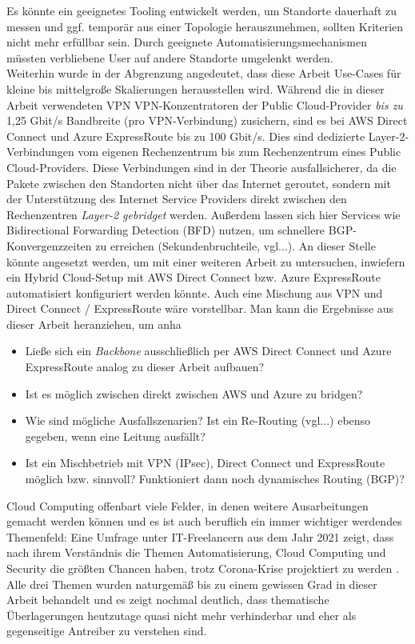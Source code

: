 Es könnte ein geeignetes Tooling entwickelt werden, um Standorte dauerhaft zu messen und ggf. temporär aus einer Topologie herauszunehmen, sollten Kriterien nicht mehr erfüllbar sein. Durch geeignete Automatisierungsmechanismen müssten verbliebene User auf andere Standorte \glqq umgelenkt\grqq{} werden.\\
Weiterhin wurde in der Abgrenzung angedeutet, dass diese Arbeit Use-Cases für kleine bis mittelgroße Skalierungen herausstellen wird. Während die in dieser Arbeit verwendeten VPN VPN-Konzentratoren der Public Cloud-Provider \textit{bis zu} 1,25 Gbit/s Bandbreite (pro VPN-Verbindung) zusichern, sind es bei AWS Direct Connect \cite{awsdc2020} und Azure ExpressRoute \cite{Washam2014} bis zu 100 Gbit/s. Dies sind dedizierte Layer-2-Verbindungen vom eigenen Rechenzentrum bis zum Rechenzentrum eines Public Cloud-Providers. Diese Verbindungen sind in der Theorie ausfallsicherer, da die Pakete zwischen den Standorten nicht über das Internet geroutet, sondern mit der Unterstützung des Internet Service Providers direkt zwischen den Rechenzentren \textit{Layer-2 gebridget} werden. Außerdem lassen sich hier Services wie Bidirectional Forwarding Detection (BFD) nutzen, um schnellere BGP-Konvergenzzeiten zu erreichen (Sekundenbruchteile, vgl...).
An dieser Stelle könnte angesetzt werden, um mit einer weiteren Arbeit zu untersuchen, inwiefern ein Hybrid Cloud-Setup mit AWS Direct Connect bzw. Azure ExpressRoute automatisiert konfiguriert werden könnte. Auch eine Mischung aus VPN und Direct Connect / ExpressRoute wäre vorstellbar. Man kann die Ergebnisse aus dieser Arbeit heranziehen, um anha
\begin{itemize}
    \item Ließe sich ein \textit{Backbone} ausschließlich per AWS Direct Connect und Azure ExpressRoute analog zu dieser Arbeit aufbauen?
    \item Ist es möglich zwischen direkt zwischen AWS und Azure zu bridgen?
    \item Wie sind mögliche Ausfallszenarien? Ist ein Re-Routing (vgl...) ebenso gegeben, wenn eine Leitung ausfällt?
    \item Ist ein Mischbetrieb mit VPN (IPsec), Direct Connect und ExpressRoute möglich bzw. sinnvoll? Funktioniert dann noch dynamisches Routing (BGP)?
\end{itemize}
Cloud Computing offenbart viele Felder, in denen weitere Ausarbeitungen gemacht werden können und es ist auch beruflich ein immer wichtiger werdendes Themenfeld:
Eine Umfrage unter IT-Freelancern aus dem Jahr 2021 zeigt, dass nach ihrem Verständnis die Themen Automatisierung, Cloud Computing und Security die größten Chancen haben, trotz Corona-Krise projektiert zu werden \cite{SOLCOMGmbH2021}. Alle drei Themen wurden \glqq naturgemäß\grqq{} bis zu einem gewissen Grad in dieser Arbeit behandelt und es zeigt nochmal deutlich, dass thematische Überlagerungen heutzutage quasi nicht mehr verhinderbar und eher als gegenseitige Antreiber zu verstehen sind.



